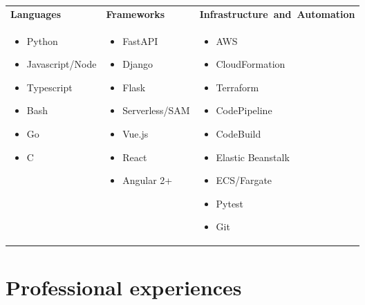 \documentclass[letterpaper]{twentysecondcv} %
\begin{document}
\begin{tabular}{ p{4cm} p{4cm} p{5cm}}
    \textbf{Languages} & \textbf{Frameworks} & \textbf{Infrastructure~and~Automation} \\
    
    \begin{itemize}
      \item Python 
      \item Javascript/Node
      \item Typescript 
      \item Bash 
      \item Go
      \item C 
    \end{itemize}  &
    \begin{itemize}
      \item FastAPI
      \item Django
      \item Flask 
      \item Serverless/SAM
      \item Vue.js 
      \item React 
      \item Angular 2+ 
    \end{itemize} &
    \begin{itemize}
      \item AWS 
      \item CloudFormation 
      \item Terraform
      \item CodePipeline
      \item CodeBuild
      \item Elastic Beanstalk
      \item ECS/Fargate
      \item Pytest
      \item Git 
    \end{itemize} \\
\end{tabular}

\vspace{-0.5cm}


\section{Professional experiences}
\end{document}
